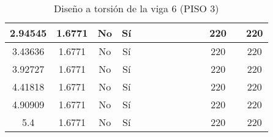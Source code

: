 \begin{table}[H]
{\begin{tabular}{|c|c|c|c|c|c|c|c|c|c|c|c|c|c|}
\hline
2.94545 & 1.6771 & No  & Sí  &     &     &     &     &     &     &     & 220 &     & 220 \bigstrut\\
\hline
3.43636 & 1.6771 & No  & Sí  &     &     &     &     &     &     &     & 220 &     & 220 \bigstrut\\
\hline
3.92727 & 1.6771 & No  & Sí  &     &     &     &     &     &     &     & 220 &     & 220 \bigstrut\\
\hline
4.41818 & 1.6771 & No  & Sí  &     &     &     &     &     &     &     & 220 &     & 220 \bigstrut\\
\hline
4.90909 & 1.6771 & No  & Sí  &     &     &     &     &     &     &     & 220 &     & 220 \bigstrut\\
\hline
5.4 & 1.6771 & No  & Sí  &     &     &     &     &     &     &     & 220 &     & 220 \bigstrut\\
\hline
\end{tabular}%

  }
      \caption{Diseño a torsión de la viga 6 (PISO 3) }
  \label{tab:T VG6 P3 }%
\end{table}%
